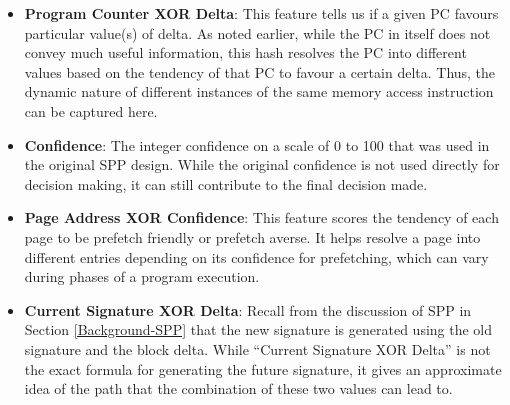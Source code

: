 \begin{itemize}
\item \textbf{Program Counter XOR Delta}: This feature tells us if a given PC
  favours particular value(s) of delta.  As noted earlier, while the PC in
  itself does not convey much useful information, this hash resolves the PC
  into different values based on the tendency of that PC to favour a certain
  delta.  Thus, the dynamic nature of different instances of the same memory
  access instruction can be captured here.

\item \textbf{Confidence}: The integer confidence on a scale of 0 to
  100 that was used in the original SPP design.  While the original confidence
  is not used directly for decision making, it can still contribute to the
  final decision made.

\item \textbf{Page Address XOR Confidence}: This feature scores the tendency
  of each page to be prefetch friendly or prefetch averse. It helps resolve a
  page into different entries depending on its confidence for prefetching, which
  can vary during phases of a program execution.

\item \textbf{Current Signature XOR Delta}: Recall from
  the discussion of SPP in Section \ref{Background-SPP} that the new signature
  is generated using the old signature and the block delta.  While ``Current
  Signature XOR Delta'' is not the exact formula for generating the future
  signature, it gives an approximate idea of the path that the combination of
  these two values can lead to.


\end{itemize} 


